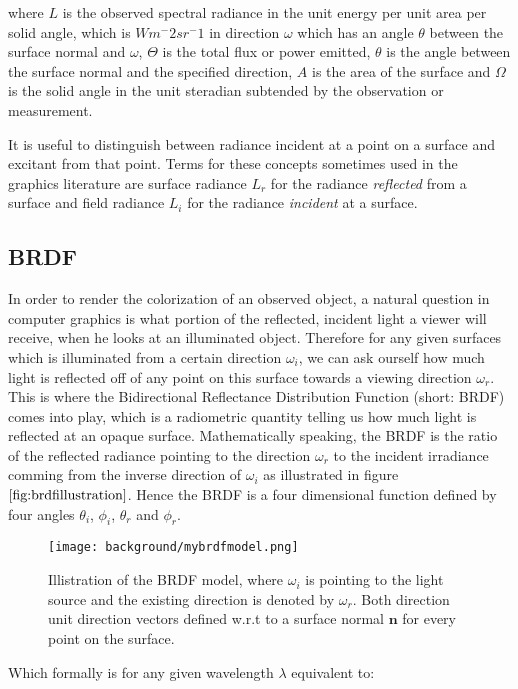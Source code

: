 where $L$ is the observed spectral radiance in the unit energy per unit area per solid angle, which is $Wm^-2 sr^-1$ in direction $\omega$ which has an angle $\theta$ between the surface normal and $\omega$, $\Theta$ is the total flux or power emitted, $\theta$ is the angle between the surface normal and the specified direction, $A$ is the area of the surface and $\Omega$ is the solid angle in the unit steradian subtended by the observation or measurement.

It is useful to distinguish between radiance incident at a point on a surface and excitant from that point. Terms for these concepts sometimes used in the graphics literature are surface radiance $L_r$ for the radiance \textit{reflected} from a surface and field radiance $L_i$ for the radiance \textit{incident} at a surface.  

\subsection{BRDF}
In order to render the colorization of an observed object, a natural question in computer graphics is what portion of the reflected, incident light a viewer will receive, when he looks at an illuminated object. Therefore for any given surfaces which is illuminated from a certain direction $\omega_i$, we can ask ourself how much light is reflected off of any point on this surface towards a viewing direction $\omega_r$. This is where the Bidirectional Reflectance Distribution Function (short: BRDF) comes into play, which is a radiometric quantity telling us how much light is reflected at an opaque surface. Mathematically speaking, the BRDF is the ratio of the reflected radiance pointing to the direction $\omega_r$ to the incident irradiance comming from the inverse direction of $\omega_i$ as illustrated in figure $\ref{fig:brdfillustration}$. Hence the BRDF is a four dimensional function defined by four angles $\theta_i$, $\phi_i$, $\theta_r$ and $\phi_r$.

\begin{figure}[ht]
  \centering
  \texttt{[image: background/mybrdfmodel.png]}
  \caption[BRDF Model]{Illistration of the BRDF model, where $\omega_i$ is pointing to the light source and the existing direction is denoted by $\omega_r$. Both direction unit direction vectors defined w.r.t to a surface normal $\mathbf{n}$ for every point on the surface.}
  \label{fig:brdfillustration}  
\end{figure}

Which formally is for any given wavelength $\lambda$ equivalent to:


